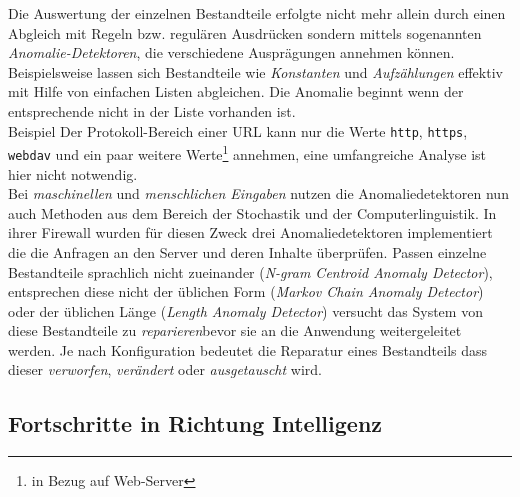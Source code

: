 
Die Auswertung der einzelnen Bestandteile erfolgte nicht mehr allein durch einen Abgleich mit Regeln bzw. regulären Ausdrücken sondern mittels sogenannten \emph{Anomalie-Detektoren}, die verschiedene Ausprägungen annehmen können. Beispielsweise lassen sich Bestandteile wie \emph{Konstanten} und \emph{Aufzählungen} effektiv mit Hilfe von einfachen Listen abgleichen. Die Anomalie beginnt wenn der entsprechende nicht in der Liste vorhanden ist.\\

\textcolor{bhtGray}{ Beispiel} Der Protokoll-Bereich einer URL kann nur die Werte \verb=http=, \verb=https=, \verb=webdav= und ein paar weitere Werte\footnote{in Bezug auf Web-Server} annehmen, eine umfangreiche Analyse ist hier nicht notwendig. \\

Bei \emph{maschinellen} und \emph{menschlichen Eingaben} nutzen die Anomaliedetektoren nun auch Methoden aus dem Bereich der Stochastik und der Computerlinguistik. In ihrer Firewall wurden für diesen Zweck drei Anomaliedetektoren implementiert die die Anfragen an den Server und deren Inhalte überprüfen. Passen einzelne Bestandteile sprachlich nicht zueinander (\emph{N-gram Centroid Anomaly Detector}), entsprechen diese nicht der üblichen Form (\emph{Markov Chain Anomaly Detector}) oder der üblichen Länge (\emph{Length Anomaly Detector}) versucht das System von~\cite{Krueger2010} diese Bestandteile zu \glqq\emph{reparieren}\grqq bevor sie an die Anwendung weitergeleitet werden. Je nach Konfiguration bedeutet die Reparatur eines Bestandteils dass dieser \emph{verworfen}, \emph{verändert} oder \emph{ausgetauscht} wird.



\subsection{Fortschritte in Richtung Intelligenz}

